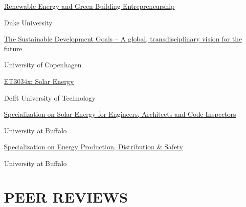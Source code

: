 \documentclass[]{Keval-resume}
\begin{document}
{{\begin{minipage}[t]{.6\textwidth}
	\textbullet{} \href{https://www.coursera.org/account/accomplishments/certificate/56Z2G4C65N9A}{{Renewable Energy and Green Building Entrepreneurship}}
\end{minipage}%
\begin{minipage}[t]{.4\textwidth}
	\hfill Duke University
\end{minipage}
\begin{minipage}[t]{.7\textwidth}
	\textbullet{} \href{https://www.coursera.org/account/accomplishments/certificate/QGYJ3URTGXME}{{The Sustainable Development Goals – A global, transdisciplinary vision for the future}}
\end{minipage}%
\begin{minipage}[t]{.3\textwidth}
	\hfill University of Copenhagen
\end{minipage}
\begin{minipage}[t]{.6\textwidth}
	\textbullet{} \href{https://courses.edx.org/certificates/337863a0e2af43d8bd4373ecc304ee75}{{ET3034x: Solar Energy}}
\end{minipage}%
\begin{minipage}[t]{.4\textwidth}
	\hfill Delft University of Technology
\end{minipage}
\begin{minipage}[t]{.65\textwidth}
	\textbullet{} \href{https://www.coursera.org/account/accomplishments/specialization/certificate/7T9CZEJ5ZABN}{{Specialization on Solar Energy for Engineers, Architects and Code Inspectors}}
\end{minipage}%
\begin{minipage}[t]{.35\textwidth}
	\hfill University at Buffalo
\end{minipage}
\begin{minipage}[t]{.65\textwidth}
	\textbullet{} \href{https://www.coursera.org/account/accomplishments/specialization/certificate/G5WV25E3CDY6}{{Specialization on Energy Production, Distribution \& Safety}}
\end{minipage}%
\begin{minipage}[t]{.35\textwidth}
	\hfill University at Buffalo
\end{minipage}
\sectionsep

\section{PEER REVIEWS} 
\hrulefill
\postsectionsep

}}
\end{document}
